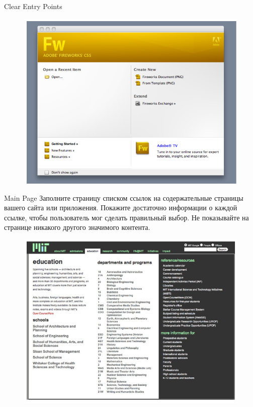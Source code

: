 \documentclass{beamer}
\begin{document}
\begin{frame}[t]{Clear Entry Points}
	\begin{figure}[h]
		\centering
		\includegraphics[scale=0.5]{images/lec07-pic24.png}
	\end{figure}
\end{frame}

\begin{frame}[t]{Main Page}
	Заполните страницу списком ссылок на содержательные страницы вашего сайта или приложения. Покажите достаточно информации о каждой ссылке, чтобы пользователь мог сделать правильный выбор. Не показывайте на странице никакого другого значимого
контента. 
	\begin{figure}[h]
		\centering
		\includegraphics[scale=0.4]{images/lec07-pic26.png}
	\end{figure}
\end{frame}
\end{document}
